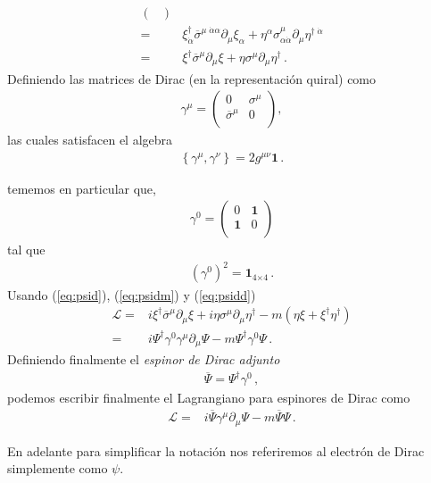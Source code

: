 \begin{frame}
\begin{align}
\begin{pmatrix}
  \end{pmatrix}\nonumber\\
=&\xi^{\dagger}_{\dot{\alpha}}\overline{\sigma}^{\mu\;\dot{\alpha}\alpha}\partial_{\mu}\xi_{\alpha}+\eta^{\alpha}\sigma^{\mu}_{\alpha\dot{\alpha}}\partial_{\mu}\eta^{\dagger\;\dot{\alpha}}\nonumber\\
=&\xi^{\dagger}\overline{\sigma}^{\mu}\partial_{\mu}\xi+\eta\sigma^{\mu}\partial_{\mu}\eta^{\dagger}\,.
\end{align}
Definiendo las matrices de Dirac (en la representación quiral) como
\begin{align}
  \gamma^\mu= \begin{pmatrix}
    0           &\sigma^{\mu}\\
    \overline{\sigma}^{\mu} &0\\
  \end{pmatrix},
\end{align}
las cuales satisfacen el algebra
\begin{align}
  \left\{ \gamma^{\mu},\gamma^{\nu} \right\}=2 g^{\mu\nu}\boldsymbol{1}\,.
\end{align}

tememos en particular que, 
\begin{align}
  \gamma^0= \begin{pmatrix}
    0           &\boldsymbol{1}\\
    \boldsymbol{1} &0\\
  \end{pmatrix}
\end{align}
tal que
\begin{align}
  \left( \gamma^{0} \right)^2=\boldsymbol{1}_{\text{4$\times 4$}}\,.
\end{align}
Usando (\ref{eq:psid}), (\ref{eq:psidm}) y (\ref{eq:psidd})
\begin{align}
  \mathcal{L}=&i\xi^{\dagger}\overline{\sigma}^{\mu}\partial_{\mu}\xi+i\eta\sigma^{\mu}\partial_{\mu}\eta^{\dagger}
-m \left(\eta\xi+\xi^{\dagger}\eta^{\dagger} \right)\nonumber\\
=&i\Psi^{\dagger}\gamma^{0}\gamma^{\mu}\partial_{\mu}\Psi-m\Psi^{\dagger}\gamma^{0}\Psi\,.
\end{align}
Definiendo finalmente el \emph{espinor de Dirac adjunto}
\begin{align}
  \overline{\Psi}=\Psi^{\dagger}\gamma^{0}\,,
\end{align}
podemos escribir finalmente el Lagrangiano para espinores de Dirac  como
\begin{align}
\label{eq:115qftnew}
  \mathcal{L}=&i\overline{\Psi}\gamma^{\mu}\partial_{\mu}\Psi-m\overline{\Psi}\Psi\,.
\end{align}
\end{frame}
En adelante para simplificar la notación nos referiremos al electrón de Dirac simplemente como $\psi$.

